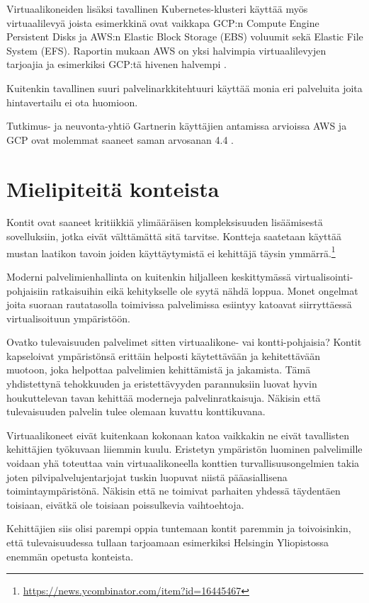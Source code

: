 \documentclass[finnish,gradu]{tktltiki3}
\begin{document}
Virtuaalikoneiden lisäksi tavallinen Kubernetes-klusteri käyttää myös virtuaalilevyä joista esimerkkinä ovat vaikkapa GCP:n Compute Engine Persistent Disks ja AWS:n Elastic Block Storage (EBS) voluumit sekä Elastic File System (EFS). Raportin mukaan AWS on yksi halvimpia virtuaalilevyjen tarjoajia ja esimerkiksi GCP:tä hivenen halvempi \cite{cloud-price-comparison}.

Kuitenkin tavallinen suuri palvelinarkkitehtuuri käyttää monia eri palveluita joita hintavertailu ei ota huomioon.

Tutkimus- ja neuvonta-yhtiö Gartnerin käyttäjien antamissa arvioissa AWS ja GCP ovat molemmat saaneet saman arvosanan 4.4 \cite{gartner-aws-gcp}.

\section{Mielipiteitä konteista}

Kontit ovat saaneet kritiikkiä ylimääräisen kompleksisuuden lisäämisestä sovelluksiin, jotka eivät välttämättä sitä tarvitse. Kontteja saatetaan käyttää mustan laatikon tavoin joiden käyttäytymistä ei kehittäjä täysin ymmärrä.\footnote{\url{https://news.ycombinator.com/item?id=16445467}}

Moderni palvelimienhallinta on kuitenkin hiljalleen keskittymässä virtualisointi-pohjaisiin ratkaisuihin eikä kehitykselle ole syytä nähdä loppua. Monet ongelmat joita suoraan rautatasolla toimivissa palvelimissa esiintyy katoavat siirryttäessä virtualisoituun ympäristöön. 

Ovatko tulevaisuuden palvelimet sitten virtuaalikone- vai kontti-pohjaisia? Kontit kapseloivat ympäristönsä erittäin helposti käytettävään ja kehitettävään muotoon, joka helpottaa palvelimien kehittämistä ja jakamista. Tämä yhdistettynä tehokkuuden ja eristettävyyden parannuksiin luovat hyvin houkuttelevan tavan kehittää moderneja palvelinratkaisuja. Näkisin että tulevaisuuden palvelin tulee olemaan kuvattu konttikuvana.

Virtuaalikoneet eivät kuitenkaan kokonaan katoa vaikkakin ne eivät tavallisten kehittäjien työkuvaan liiemmin kuulu. Eristetyn ympäristön luominen palvelimille voidaan yhä toteuttaa vain virtuaalikoneella konttien turvallisuusongelmien takia joten pilvipalvelujentarjojat tuskin luopuvat niistä pääasiallisena toimintaympäristönä. Näkisin että ne toimivat parhaiten yhdessä täydentäen toisiaan, eivätkä ole toisiaan poissulkevia vaihtoehtoja.

Kehittäjien siis olisi parempi oppia tuntemaan kontit paremmin ja toivoisinkin, että tulevaisuudessa tullaan tarjoamaan esimerkiksi Helsingin Yliopistossa enemmän opetusta konteista.
\end{document}
